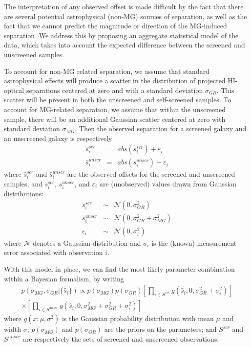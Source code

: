 \documentclass[useAMS,usenatbib,twocolumn]{mn2e}
\begin{document}
The interpretation of any observed offset
is made difficult by the fact that there are several potential
astrophysical (non-MG) sources of separation, as well as the fact that we
cannot predict the magnitude or direction of the MG-induced separation.
We address this by proposing an aggregate statistical model of the data,
which takes into account the expected difference between the screened and
unscreened samples.

To account for non-MG related separation, we assume that standard
astrophysical effects will produce a
scatter in the distribution of projected HI-optical separations centered
at zero and with a standard deviation $\sigma_{GR}$.  This scatter will
be present in both the unscreened and self-screened samples.
To account for MG-related separation, we
assume that within the unscreened sample, there will be an additional
Gaussian scatter centered at zero with standard deviation $\sigma_{MG}$.
Then the observed separation for a screened galaxy and an unscreened galaxy
is respectively
\begin{eqnarray}
  \hat{s}^{scr}_i &=& abs(s^{scr}_i) + \varepsilon_i \nonumber\\
  \hat{s}^{unscr}_i &=& abs(s^{unscr}_i) + \varepsilon_i
\end{eqnarray}
where $\hat{s}^{scr}_i$ and $\hat{s}^{unscr}_i$ are the observed offsets
for the screened and unscreened samples, and
 $s^{scr}_i$, $s^{unscr}_i$, and $\varepsilon_i$ are (unobserved) values
drawn from Gaussian distributions:
\begin{eqnarray}
  s^{scr}_i &\sim& \mathcal{N}(0, \sigma_{GR}^2) \nonumber\\
  s^{unscr}_i &\sim& \mathcal{N}(0, \sigma_{GR}^2 + \sigma_{MG}^2) \nonumber\\
  \epsilon_i &\sim& \mathcal{N}(0, \sigma_i^2)
\end{eqnarray}
where  $\mathcal{N}$ denotes a Gaussian distribution and $\sigma_i$ is the
(known)
measurement error associated with observation $i$.

With this model in place, we can find the most likely parameter combination
within a Bayesian formalism, by writing
\begin{equation}
\begin{split}
  \label{eq:separation_likelihood}
  p(\sigma_{MG}, \sigma_{GR}|\{\hat{s}_i\})
  \propto p(\sigma_{MG})p(\sigma_{GR})
  \left[ \prod_{i \in S^{scr}} g(\hat{s}_i;0, \sigma_{GR}^2 +
\sigma_i^2)\right]\\
\times
  \left[ \prod_{i \in S^{unscr}} g(\hat{s}_i;0, \sigma_{MG}^2 +
\sigma_{GR}^2 + \sigma_i^2)\right]
\end{split}
\end{equation}
where $g(x;\mu,\sigma^2)$ is the Gaussian probability distribution with
mean $\mu$ and width $\sigma$; $p(\sigma_{MG})$ and $p(\sigma_{GR})$ are the
priors on the parameters; and $S^{scr}$ and $S^{unscr}$ are respectively the
sets of screened and unscreened observations.
\end{document}
